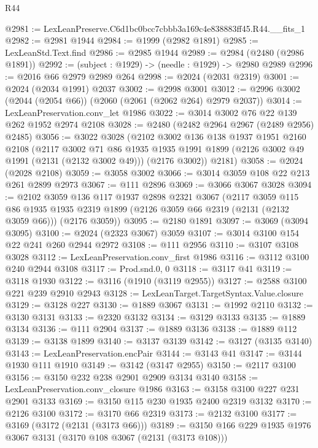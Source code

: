 \begin{lexlean}{R44}
\begin{coremodule}
@2981 := LexLeanPreserve.C6d1bc0bcc7cbbb3a169c4e838883ff45.R44.__fits_1
@2982 := @2981 @1944
@2984 := @1999 (@2982 @1891)
@2985 := LexLeanStd.Text.find
@2986 := @2985 @1944
@2989 := @2984 (@2480 (@2986 @1891))
@2992 := (subject : @1929) -> (needle : @1929) -> @2980 @2989
@2996 := @2016 @66 @2979 @2989 @264
@2998 := @2024 (@2031 @2319)
@3001 := @2024 (@2034 @1991) @2037
@3002 := @2998 @3001
@3012 := @2996 @3002 (@2044 (@2054 @66)) (@2060 (@2061 (@2062 @264) @2979 @2037))
@3014 := LexLeanPreservation.conv_let @1986
@3022 := @3014 @3002 @76 @22 @139 @262 @1952 @2974 @2108
@3028 := @2480 (@2482 @2964 @2967 (@2489 @2956) @2485)
@3056 := @3022
    @3028
    (@2102
      @3002
      @136
      @138
      @1937
      @1951
      @2160
      @2108
      (@2117
        @3002
        @71
        @86
        @1935
        @1935
        @1991
        @1899
        (@2126 @3002 @49 @1991 (@2131 (@2132 @3002 @49)))
        (@2176 @3002))
      @2181)
@3058 := @2024 (@2028 @2108)
@3059 := @3058 @3002
@3066 := @3014 @3059 @108 @22 @213 @261 @2899 @2973
@3067 := @111 @2896
@3069 := @3066 @3067 @3028
@3094 := @2102
    @3059
    @136
    @117
    @1937
    @2898
    @2321
    @3067
    (@2117
      @3059
      @115
      @86
      @1935
      @1935
      @2319
      @1899
      (@2126 @3059 @66 @2319 (@2131 (@2132 @3059 @66)))
      (@2176 @3059))
@3095 := @2180 @1891
@3097 := @3069 (@3094 @3095)
@3100 := @2024 (@2323 @3067) @3059
@3107 := @3014 @3100 @154 @22 @241 @260 @2944 @2972
@3108 := @111 @2956
@3110 := @3107 @3108 @3028
@3112 := LexLeanPreservation.conv_first @1986
@3116 := @3112 @3100 @240 @2944 @3108
@3117 := Prod.snd.{0, 0}
@3118 := @3117 @41
@3119 := @3118 @1930
@3122 := @3116 (@1910 (@3119 @2955))
@3127 := @2588 @3100 @221 @239 @2910 @2943
@3128 := LexLeanTarget.TargetSyntax.Value.closure
@3129 := @3128 @227
@3130 := @1889 @3067
@3131 := @1992 @2110
@3132 := @3130 @3131
@3133 := @2320 @3132
@3134 := @3129 @3133
@3135 := @1889 @3134
@3136 := @111 @2904
@3137 := @1889 @3136
@3138 := @1889 @112
@3139 := @3138 @1899
@3140 := @3137 @3139
@3142 := @3127 (@3135 @3140)
@3143 := LexLeanPreservation.encPair
@3144 := @3143 @41
@3147 := @3144 @1930 @111 @1910
@3149 := @3142 (@3147 @2955)
@3150 := @2117 @3100
@3156 := @3150 @232 @238 @2901 @2909 @3134 @3140
@3158 := LexLeanPreservation.conv_closure @1986
@3163 := @3158 @3100 @227 @231 @2901 @3133
@3169 := @3150 @115 @230 @1935 @2400 @2319 @3132
@3170 := @2126 @3100
@3172 := @3170 @66 @2319
@3173 := @2132 @3100
@3177 := @3169 (@3172 (@2131 (@3173 @66)))
@3189 := @3150 @166 @229 @1935 @1976 @3067 @3131 (@3170 @108 @3067 (@2131 (@3173 @108)))

\end{coremodule}
\end{lexlean}

